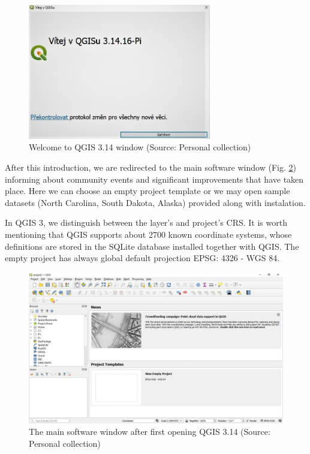 \documentclass[a4paper,10pt,twoside]{article}
\begin{document}
\vspace{0.3cm}
\begin{figure}[hbt!] 
\begin{center}
\includegraphics[width=8cm]{../pictures/qgis_startup_window.JPG} 
\caption[Welcome to QGIS 3.14 window]{Welcome to QGIS 3.14 window (Source: Personal collection)}
\label{fig:qgis_startup_window}
\end{center}
\end{figure}

\noindent After this introduction, we are redirected to the main software window (Fig. \ref{fig:qgis_first_window})  informing about community events and significant improvements that have taken place. Here we can choose an empty project template or we may open sample datasets (North Carolina, South Dakota, Alaska) provided along with instalation.

In QGIS 3, we distinguish between the layer's and project's CRS. It is worth mentioning that QGIS supports about 2700 known coordinate systems, whose definitions are stored in the SQLite database installed together with QGIS. The empty project has always global default projection EPSG: 4326 - WGS 84.

\vspace{0.3cm}
\begin{figure}[hbt!] 
\begin{center}
\includegraphics[width=17cm]{../pictures/qgis_first_window.JPG} 
\caption[The main software window after first opening QGIS 3.14]{The main software window after first opening QGIS 3.14 (Source: Personal collection)}
\label{fig:qgis_first_window}
\end{center}
\end{figure}
\end{document}
